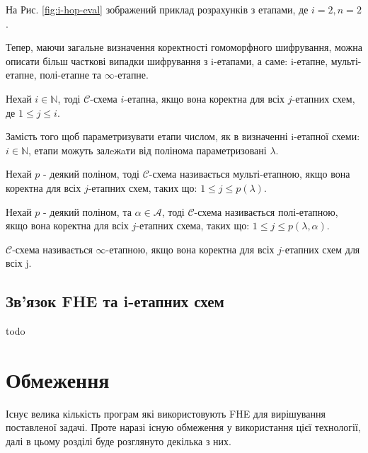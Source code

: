 На Рис. \ref{fig:i-hop-eval} зображений приклад розрахунків з етапами, де \(i=2,n=2\).

Тепер, маючи загальне визначення коректності гомоморфного шифрування, можна описати більш
часткові випадки шифрування з i-етапами, а саме: i-етапне, мульті-етапне, полі-етапне та
\(\infty\)-етапне.

\begin{definition}
    Нехай \(i \in \mathbb{N}\), тоді \(\mathcal{C}\)-схема \(i\)-етапна, якщо вона
    коректна для всіх \(j\)-етапних схем, де \(1 \leq j \leq i\).
\end{definition}

Замість того щоб параметризувати етапи числом, як в визначенні i-етапної схеми: \(i \in 
\mathbb{N}\), етапи можуть залeжaти від полінома параметризовані \(\lambda\).

\begin{definition}
    Нехай \(p\) - деякий поліном, тоді \(\mathcal{C}\)-схема називається мульті-етапною,
якщо вона коректна для всіх \(j\)-етапних схем, таких  що: \(1 \leq j \leq p(\lambda)\).
\end{definition}

\begin{definition}
    Нехай \(p\) - деякий поліном, та \(\alpha \in \mathcal{A}\), тоді 
    \(\mathcal{C}\)-схема називається полі-етапною, якщо вона коректна для 
    всіх \(j\)-етапних схема, таких  що: \(1 \leq j \leq p(\lambda, \alpha)\).
\end{definition}

\begin{definition}
    \(\mathcal{C}\)-схема називається \(\infty\)-етапною, якщо вона коректна для всіх \(j\)-етапних схем для всіх j.
\end{definition}

\subsection{Зв'язок FHE та i-етапних схем}
todo

\section{Обмеження}
Існує велика кількість програм які використовують FHE для вирішування поставленої задачі. Проте
наразі існую обмеження у використання цієї технології, далі в цьому розділі буде розглянуто 
декілька з них. 

